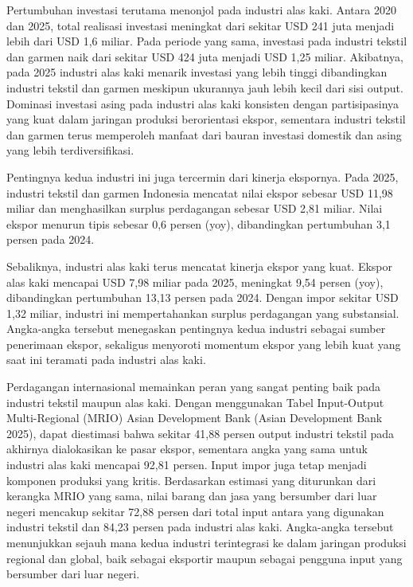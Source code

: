 \documentclass[
  manuscript=article,
  layout=publish,
  year=2026,
  volume=1,
]{den}
\begin{document}
Pertumbuhan investasi terutama menonjol pada industri alas kaki. Antara
2020 dan 2025, total realisasi investasi meningkat dari sekitar USD 241
juta menjadi lebih dari USD 1,6 miliar. Pada periode yang sama,
investasi pada industri tekstil dan garmen naik dari sekitar USD 424
juta menjadi USD 1,25 miliar. Akibatnya, pada 2025 industri alas kaki
menarik investasi yang lebih tinggi dibandingkan industri tekstil dan
garmen meskipun ukurannya jauh lebih kecil dari sisi output. Dominasi
investasi asing pada industri alas kaki konsisten dengan partisipasinya
yang kuat dalam jaringan produksi berorientasi ekspor, sementara
industri tekstil dan garmen terus memperoleh manfaat dari bauran
investasi domestik dan asing yang lebih terdiversifikasi.

Pentingnya kedua industri ini juga tercermin dari kinerja ekspornya.
Pada 2025, industri tekstil dan garmen Indonesia mencatat nilai ekspor
sebesar USD 11,98 miliar dan menghasilkan surplus perdagangan sebesar
USD 2,81 miliar. Nilai ekspor menurun tipis sebesar 0,6 persen (yoy),
dibandingkan pertumbuhan 3,1 persen pada 2024.

Sebaliknya, industri alas kaki terus mencatat kinerja ekspor yang kuat.
Ekspor alas kaki mencapai USD 7,98 miliar pada 2025, meningkat 9,54
persen (yoy), dibandingkan pertumbuhan 13,13 persen pada 2024. Dengan
impor sekitar USD 1,32 miliar, industri ini mempertahankan surplus
perdagangan yang substansial. Angka-angka tersebut menegaskan pentingnya
kedua industri sebagai sumber penerimaan ekspor, sekaligus menyoroti
momentum ekspor yang lebih kuat yang saat ini teramati pada industri
alas kaki.

Perdagangan internasional memainkan peran yang sangat penting baik pada
industri tekstil maupun alas kaki. Dengan menggunakan Tabel Input-Output
Multi-Regional (MRIO) Asian Development Bank (Asian Development Bank
2025), dapat diestimasi bahwa sekitar 41,88 persen output industri
tekstil pada akhirnya dialokasikan ke pasar ekspor, sementara angka yang
sama untuk industri alas kaki mencapai 92,81 persen. Input impor juga
tetap menjadi komponen produksi yang kritis. Berdasarkan estimasi yang
diturunkan dari kerangka MRIO yang sama, nilai barang dan jasa yang
bersumber dari luar negeri mencakup sekitar 72,88 persen dari total
input antara yang digunakan industri tekstil dan 84,23 persen pada
industri alas kaki. Angka-angka tersebut menunjukkan sejauh mana kedua
industri terintegrasi ke dalam jaringan produksi regional dan global,
baik sebagai eksportir maupun sebagai pengguna input yang bersumber dari
luar negeri.
\end{document}
